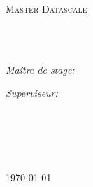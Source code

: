 \documentclass[
11pt, %
french, %
singlespacing, %
headsepline, %
]{MastersDoctoralThesis} %
\begin{document}
\begin{titlepage}
\begin{center}
\vspace*{.06\textheight}
{\scshape\LARGE \univname\par}\vspace{1.5cm} %
\textsc{\Large Master Datascale}\\[0.5cm] %

\HRule \\[0.4cm] %
{\huge \bfseries \ttitle\par}\vspace{0.4cm} %
\HRule \\[1.5cm] %
 
\begin{minipage}[t]{0.4\textwidth}
\begin{flushleft} \large
\emph{Maître de stage:}\\
\href{http://www.johnsmith.com}{\authorname} %
\end{flushleft}
\end{minipage}
\begin{minipage}[t]{0.4\textwidth}
\begin{flushright} \large
\emph{Superviseur:} \\
\href{http://www.jamessmith.com}{\supname} %
\end{flushright}
\end{minipage}\\[3cm]
 
\vfill

\groupname\\\deptname\\[2cm] %
 
\vfill

{\large \today}\\[4cm] %
 
\vfill
\end{center}
\end{titlepage}

\end{document}

